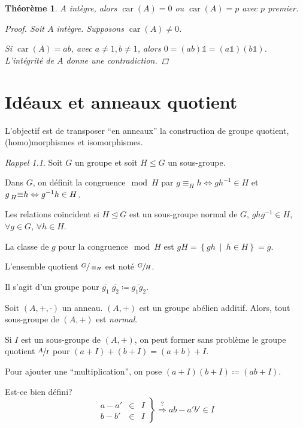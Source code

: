 \documentclass{report}
\newtheorem*{thm}{Th\'eor\`eme}
\theoremstyle{definition}
\theoremstyle{remark}
\newtheorem*{rapp}{Rappel}
\def\lte{\leqslant}
\def\id{\mathds{1}}
\newcommand*{\caract}[1]{\operatorname{car}\left(#1\right)}
\begin{document}
	\begin{thm}
		$A$ int\`egre, alors $\caract{A}=0$ ou $\caract{A}=p$ avec $p$ premier.
		\begin{proof}
			Soit $A$ int\`egre. Supposons $\caract{A}\neq0$.

			Si $\caract{A}=ab$, avec $a\neq1,b\neq1$, alors $0 = (ab)\id = (a\id) (b\id)$. L'int\'egrit\'e de $A$ donne une contradiction.
		\end{proof}
	\end{thm}

	\chapter{Id\'eaux et anneaux quotient}
	L'objectif est de transposer ``en anneaux'' la construction de groupe quotient, (homo)morphismes et isomorphismes.

	\begin{rapp}
		Soit $G$ un groupe et soit $H \lte G$ un sous-groupe.

		Dans $G$, on d\'efinit la congruence$\mod H$ par $g \equiv_H h \Leftrightarrow gh^{-1} \in H$ et $g \prescript{}{H}{\equiv} h \Leftrightarrow g^{-1}h \in H$.

		Les relations co\"incident si $H \trianglelefteq G$ est un sous-groupe normal de $G$, $ghg^{-1} \in H$, $\forall g \in G$, $\forall h \in H$.

		La classe de $g$ pour la congruence$\mod H$ est $gH = \left\{ gh ~\middle|~ h \in H \right\} = \overline{g}$.

		L'ensemble quotient $\sfrac{G}{\equiv_H}$ est not\'e $\sfrac{G}{H}$.

		Il s'agit d'un groupe pour $\overline{g_1} \; \overline{g_2} \coloneq \overline{g_1g_2}$.
	\end{rapp}

	Soit $(A,+,\cdot)$ un anneau. $(A,+)$ est un groupe ab\'elien additif. Alors, tout sous-groupe de $(A,+)$ est \emph{normal}.

	Si $I$ est un sous-groupe de $(A,+)$, on peut former sans probl\`eme le groupe quotient $\sfrac{A}{I}$ pour $(a+I)+(b+I) = (a+b)+I$.

	Pour ajouter une ``multiplication'', on pose $(a+I)(b+I) \coloneq (ab+I)$.

	Est-ce bien d\'efini? \[ \left. \begin{array}{rcl}
		a-a'&\in&I\\
		b-b'&\in&I
	\end{array}\right\} \overset{?}{\Rightarrow} ab-a'b' \in I \]
\end{document}
